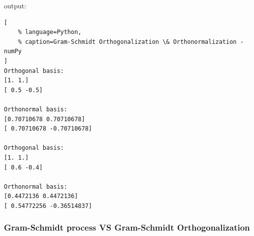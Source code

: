 output:
\begin{lstlisting}[
    % language=Python,
    % caption=Gram-Schmidt Orthogonalization \& Orthonormalization - numPy
]
Orthogonal basis:
[1. 1.]
[ 0.5 -0.5]

Orthonormal basis:
[0.70710678 0.70710678]
[ 0.70710678 -0.70710678]

Orthogonal basis:
[1. 1.]
[ 0.6 -0.4]

Orthonormal basis:
[0.4472136 0.4472136]
[ 0.54772256 -0.36514837]
\end{lstlisting}












\subsubsection{Gram-Schmidt process VS Gram-Schmidt Orthogonalization}

